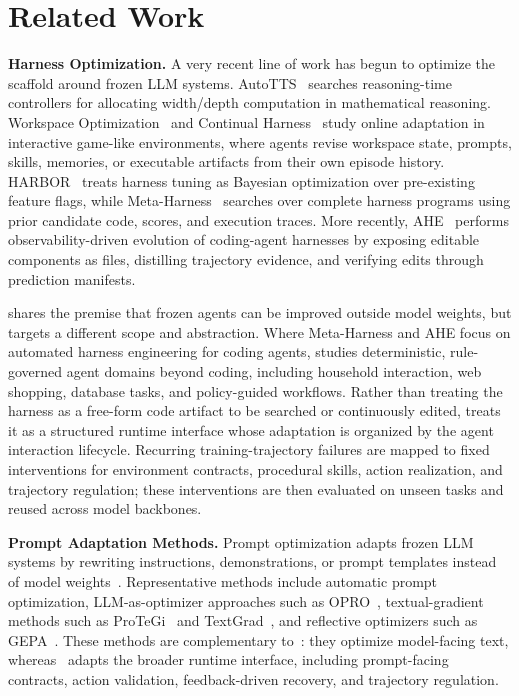 \section{Related Work}

\noindent \textbf{Harness Optimization.}
A very recent line of work has begun to optimize the scaffold around frozen LLM systems.
AutoTTS~\cite{zheng2026llms_AutoTTS_LLMs-Improving-LLMs} searches reasoning-time controllers for allocating width/depth computation in mathematical reasoning.
Workspace Optimization~\cite{sarafian2026workspace_DREAMTEAM} and Continual Harness~\cite{karten2026continual_Continual-Harness} study online adaptation in interactive game-like environments, where agents revise workspace state, prompts, skills, memories, or executable artifacts from their own episode history.
HARBOR~\cite{sengupta2026harbor_HARBOR} treats harness tuning as Bayesian optimization over pre-existing feature flags, while Meta-Harness~\cite{lee2026meta_Meta-harness} searches over complete harness programs using prior candidate code, scores, and execution traces.
More recently, AHE~\cite{lin2026agentic} performs observability-driven evolution of coding-agent harnesses by exposing editable components as files, distilling trajectory evidence, and verifying edits through prediction manifests.

\method{} shares the premise that frozen agents can be improved outside model weights, but targets a different scope and abstraction.
Where Meta-Harness and AHE focus on automated harness engineering for coding agents, \method{} studies deterministic, rule-governed agent domains beyond coding, including household interaction, web shopping, database tasks, and policy-guided workflows.
Rather than treating the harness as a free-form code artifact to be searched or continuously edited, \method{} treats it as a structured runtime interface whose adaptation is organized by the agent interaction lifecycle. Recurring training-trajectory failures are mapped to fixed interventions for environment contracts, procedural skills, action realization, and trajectory regulation; these interventions are then evaluated on unseen tasks and reused across model backbones.

\noindent \textbf{Prompt Adaptation Methods.}
Prompt optimization adapts frozen LLM systems by rewriting instructions, demonstrations, or prompt templates instead of model weights~\cite{agarwal2024promptwizard,fernando2023promptbreeder}.
Representative methods include automatic prompt optimization, LLM-as-optimizer approaches such as OPRO~\cite{ORPO_yang2024large_Large-language-models-as-optimizers}, textual-gradient methods such as ProTeGi~\cite{pryzant2023automatic_ProTeGi_Automatic-prompt-optimization-with-gradient-descent-and-beam-search} and TextGrad~\cite{yuksekgonul2024textgrad_Textgrad-Automatic-differentiation-via-text}, and reflective optimizers such as GEPA~\cite{agrawal2025gepa_Gepa-Reflective-prompt-evolution-can-outperform-reinforcement-learning}.
These methods are complementary to~\method{}: they optimize model-facing text, whereas~\method{} adapts the broader runtime interface, including prompt-facing contracts, action validation, feedback-driven recovery, and trajectory regulation.

